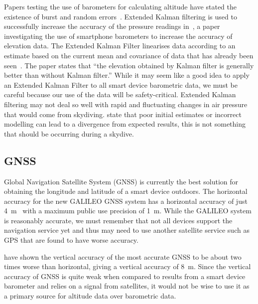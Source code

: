 \documentclass[11pt, a4paper, twocolumn]{article}
\begin{document}
Papers testing the use of barometers for calculating altitude have stated the existence of burst and random errors~\cite{gray_integrated_1995, liu_beyond_2014}. Extended Kalman filtering is used to successfully increase the accuracy of the pressure readings in~\textcite{liu_beyond_2014}, a paper investigating the use of smartphone barometers to increase the accuracy of elevation data. The Extended Kalman Filter linearises data according to an estimate based on the current mean and covariance of data that has already been seen~\cite{julier_unscented_2004}. The paper states that ``the elevation obtained by Kalman filter is generally better than without Kalman filter.'' While it may seem like a good idea to apply an Extended Kalman Filter to all smart device barometric data, we must be careful because our use of the data will be safety-critical. Extended Kalman filtering may not deal so well with rapid and fluctuating changes in air pressure that would come from skydiving. \textcite{huang_analysis_2008} state that poor initial estimates or incorrect modelling can lead to a divergence from expected results, this is not something that should be occurring during a skydive.

\subsection{GNSS}\label{sec:gps} %

Global Navigation Satellite System (GNSS) is currently the best solution for obtaining the longitude and latitude of a smart device outdoors. The horizontal accuracy for the new GALILEO GNSS system has a horizontal accuracy of just \SI{4}{\metre}~\cite{kaplan_understanding_2005} with a maximum public use precision of \SI{1}{\metre}. While the GALILEO system is reasonably accurate, we must remember that not all devices support the navigation service yet and thus may need to use another satellite service such as GPS that are found to have worse accuracy.

\textcite{kaplan_understanding_2005} have shown the vertical accuracy of the most accurate GNSS to be about two times worse than horizontal, giving a vertical accuracy of \SI{8}{\metre}. Since the vertical accuracy of GNSS is quite weak when compared to results from a smart device barometer and relies on a signal from satellites, it would not be wise to use it as a primary source for altitude data over barometric data.
\end{document}
